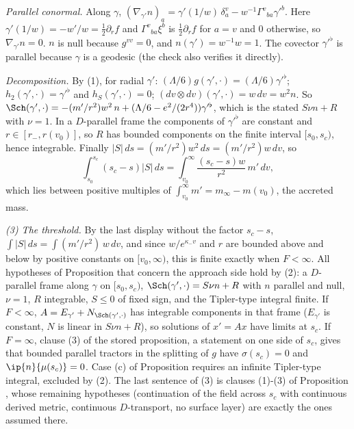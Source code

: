 \emph{Parallel conormal.} Along $\gamma$, $(\nabla_{\gamma'}n)_{a} = \gamma'(1/w)\,\delta^{v}_{a} - w^{-1}\Gamma^{v}{}_{ba}\gamma'^{b}$. Here $\gamma'(1/w) = -w'/w = \frac12\partial_{r}f$ and $\Gamma^{v}{}_{ba}\xi^{b}$ is $\frac12\partial_{r}f$ for $a = v$ and $0$ otherwise, so $\nabla_{\gamma'}n = 0$. $n$ is null because $g^{vv} = 0$, and $n(\gamma') = w^{-1}w = 1$. The covector $\gamma'^{\flat}$ is parallel because $\gamma$ is a geodesic (the check also verifies it directly).

\emph{Decomposition.} By (1), for radial $\gamma'$: $(\Lambda/6)g(\gamma', \cdot) = (\Lambda/6)\gamma'^{\flat}$; $h_{2}(\gamma', \cdot) = \gamma'^{\flat}$ and $h_{S}(\gamma', \cdot) = 0$; $(dv\otimes dv)(\gamma', \cdot) = w\,dv = w^{2}n$. So $\Sch(\gamma', \cdot) = -(m'/r^{2})w^{2}\,n + (\Lambda/6 - e^{2}/(2r^{4}))\gamma'^{\flat}$, which is the stated $S\nu n + R$ with $\nu = 1$. In a $D$-parallel frame the components of $\gamma'^{\flat}$ are constant and $r \in [r_{-}, r(v_{0})]$, so $R$ has bounded components on the finite interval $[s_{0}, s_{c})$, hence integrable. Finally $|S|\,ds = (m'/r^{2})w^{2}\,ds = (m'/r^{2})w\,dv$, so
\[
\int_{s_{0}}^{s_{c}}(s_{c} - s)|S|\,ds = \int_{v_{0}}^{\infty}\frac{(s_{c} - s)w}{r^{2}}\,m'\,dv ,
\]
which lies between positive multiples of $\int_{v_{0}}^{\infty}m' = m_{\infty} - m(v_{0})$, the accreted mass.

\emph{(3) The threshold.} By the last display without the factor $s_{c} - s$, $\int|S|\,ds = \int (m'/r^{2})\,w\,dv$, and since $w/e^{\kappa_{-}v}$ and $r$ are bounded above and below by positive constants on $[v_{0}, \infty)$, this is finite exactly when $F < \infty$. All hypotheses of Proposition  that concern the approach side hold by (2): a $D$-parallel frame along $\gamma$ on $[s_{0}, s_{c})$, $\Sch(\gamma',\cdot) = S\nu n + R$ with $n$ parallel and null, $\nu = 1$, $R$ integrable, $S \le 0$ of fixed sign, and the Tipler-type integral finite. If $F < \infty$, $A = E_{\gamma'} + N_{\Sch(\gamma',\cdot)}$ has integrable components in that frame ($E_{\gamma'}$ is constant, $N$ is linear in $S\nu n + R$), so solutions of $x' = Ax$ have limits at $s_{c}$. If $F = \infty$, clause (3) of the stored proposition, a statement on one side of $s_{c}$, gives that bounded parallel tractors in the splitting of $g$ have $\sigma(s_{c}) = 0$ and $\ip{n}{\mu(s_{c})} = 0$. Case (c) of Proposition  requires an infinite Tipler-type integral, excluded by (2). The last sentence of (3) is clauses (1)-(3) of Proposition , whose remaining hypotheses (continuation of the field across $s_{c}$ with continuous derived metric, continuous $D$-transport, no surface layer) are exactly the ones assumed there.

